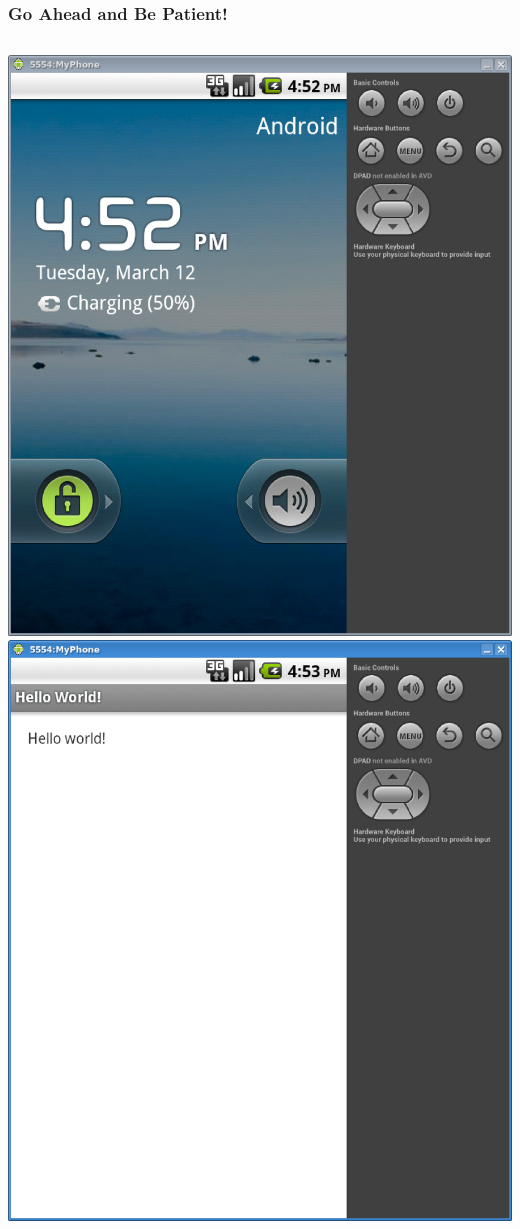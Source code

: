 \begin{frame}
\frametitle{Go Ahead and Be Patient!}
\begin{columns}
\centering
\includegraphics[width= 1.0 \textwidth]{MyPhone.eps}
\centering
\includegraphics[width= 1.0 \textwidth]{HelloWorld.eps}
\end{columns}
\end{frame}
